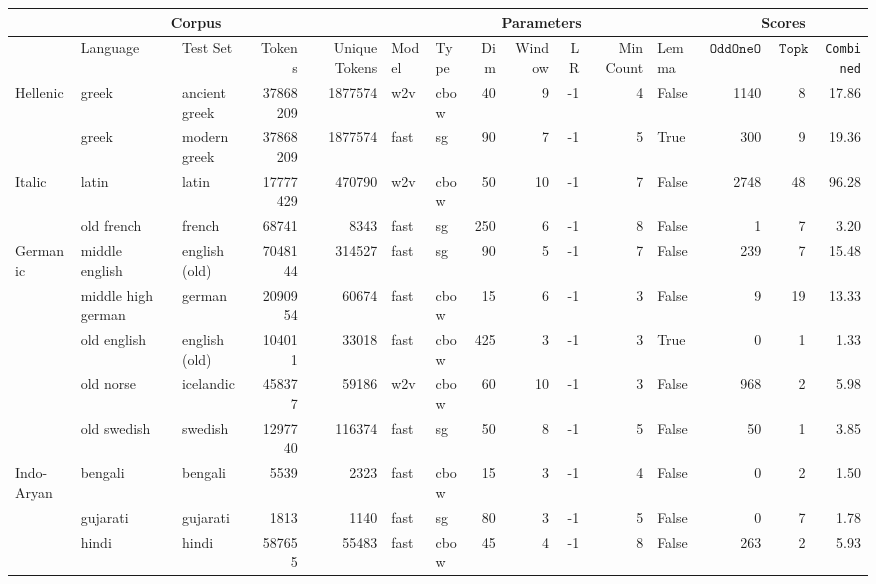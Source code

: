 \documentclass[11pt,a4paper]{article}
\DeclareMathOperator{\OddOneOut}{\texttt{OddOneOut}}
\DeclareMathOperator{\topk}{\texttt{Topk}}
\begin{document}
\begin{table}[t]
\centering
\tiny
\begin{tabular}{l|llrr|llrrrrl|rrr}
\toprule
\multicolumn{5}{c}{\bf Corpus} & \multicolumn{7}{c}{\bf Parameters} & \multicolumn{3}{c}{\bf Scores} \\
\midrule
& Language & Test Set & Tokens & Unique Tokens & Model & Type & Dim & Window & LR & Min Count & Lemma & $\OddOneOut$ & $\topk$ & \texttt{Combined} \\
\midrule
    
    \multirow{2}{*}{Hellenic}& greek & ancient greek & \num{37868209} & \num{1877574} & w2v & cbow & 40 & 9 & -1 & 4 & False & 1140 & 8 & 17.86\\
    & greek & modern greek & \num{37868209} & \num{1877574} & fast & sg & 90 & 7 & -1 & 5 & True & 300 & 9 & 19.36\\  
    \midrule
    \multirow{2}{*}{Italic}&latin & latin & \num{17777429} & \num{470790} & w2v & cbow & 50 & 10 & -1 & 7 & False & 2748 & 48 & 96.28\\ 
    &old french  & french & \num{68741} & \num{8343} &  fast & sg & 250 & 6 & -1 & 8  & False & 1 & 7 & 3.20\\
    \midrule
    \multirow{5}{*}{Germanic}&middle english & english (old) & \num{7048144} & \num{314527} & fast & sg & 90 & 5 & -1 & 7 & False & 239 & 7 & 15.48 \\
    &middle high german & german & \num{2090954} & \num{60674} & fast & cbow & 15 & 6 & -1 & 3 & False & 9 & 19 & 13.33 \\
    &old english  & english (old) & \num{104011} & \num{33018} & fast & cbow & 425 & 3 & -1 & 3 & True & 0 & 1  & 1.33 \\
    &old norse & icelandic & \num{458377} & \num{59186} & w2v & cbow & 60 & 10 & -1 & 3 & False & 968 & 2 & 5.98 \\
    &old swedish & swedish & \num{1297740} & \num{116374} &  fast & sg & 50 & 8 & -1 & 5 & False & 50 & 1 & 3.85 \\
    \midrule
    \multirow{8}{*}{Indo-Aryan}&bengali & bengali & \num{5539} & \num{2323} & fast & cbow & 15 & 3 & -1 & 4 & False & 0 & 2 & 1.50 \\
    &gujarati & gujarati & \num{1813} & \num{1140} & fast & sg & 80 & 3 & -1 & 5 & False & 0 & 7 & 1.78 \\
    &hindi & hindi& \num{587655} & \num{55483} & fast & cbow & 45 & 4 & -1 & 8 & False & 263 & 2 & 5.93\\

\end{tabular}
\end{table}
\end{document}
